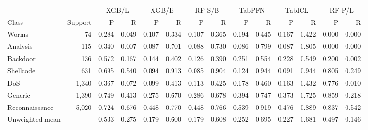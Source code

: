 \begin{tabular}{@{}lrrrrrrrrrrrrr@{}}
\toprule
 & & \multicolumn{2}{c}{XGB/L} & \multicolumn{2}{c}{XGB/B} & \multicolumn{2}{c}{RF-S/B} & \multicolumn{2}{c}{TabPFN} & \multicolumn{2}{c}{TabICL} & \multicolumn{2}{c}{RF-P/L} \\
\cmidrule(lr){3-4}\cmidrule(lr){5-6}\cmidrule(lr){7-8}\cmidrule(lr){9-10}\cmidrule(lr){11-12}\cmidrule(lr){13-14}
Class & Support & P & R & P & R & P & R & P & R & P & R & P & R \\
\midrule
Worms & 74 & 0.284 & 0.049 & 0.107 & 0.334 & 0.107 & 0.365 & 0.194 & 0.445 & 0.167 & 0.422 & 0.000 & 0.000 \\
Analysis & 115 & 0.340 & 0.007 & 0.087 & 0.701 & 0.088 & 0.730 & 0.086 & 0.799 & 0.087 & 0.805 & 0.000 & 0.000 \\
Backdoor & 136 & 0.572 & 0.167 & 0.144 & 0.402 & 0.126 & 0.390 & 0.251 & 0.554 & 0.228 & 0.549 & 0.200 & 0.002 \\
Shellcode & 631 & 0.695 & 0.540 & 0.094 & 0.913 & 0.085 & 0.904 & 0.124 & 0.944 & 0.091 & 0.944 & 0.805 & 0.249 \\
DoS & 1,340 & 0.367 & 0.072 & 0.099 & 0.413 & 0.113 & 0.425 & 0.178 & 0.460 & 0.163 & 0.432 & 0.776 & 0.010 \\
Generic & 1,390 & 0.749 & 0.413 & 0.275 & 0.670 & 0.286 & 0.678 & 0.394 & 0.747 & 0.373 & 0.725 & 0.859 & 0.218 \\
Reconnaissance & 5,020 & 0.724 & 0.676 & 0.448 & 0.770 & 0.448 & 0.766 & 0.539 & 0.919 & 0.476 & 0.889 & 0.837 & 0.542 \\
\midrule
Unweighted mean & & 0.533 & 0.275 & 0.179 & 0.600 & 0.179 & 0.608 & 0.252 & 0.695 & 0.227 & 0.681 & 0.497 & 0.146 \\
\bottomrule
\end{tabular}
